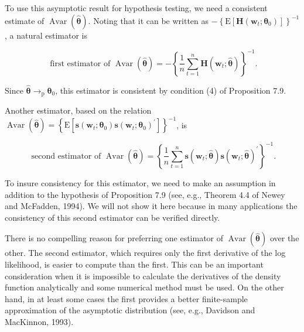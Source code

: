 \documentclass[10pt]{article}
\begin{document}
To use this asymptotic result for hypothesis testing, we need a consistent estimate of $\operatorname{Avar}(\hat{\boldsymbol{\theta}})$. Noting that it can be written as $-\left\{\mathrm{E}\left[\mathbf{H}\left(\mathbf{w}_{t} ; \boldsymbol{\theta}_{0}\right)\right]\right\}^{-1}$, a natural estimator is


\begin{equation*}
\text { first estimator of } \operatorname{Avar}(\hat{\boldsymbol{\theta}})=-\left\{\frac{1}{n} \sum_{t=1}^{n} \mathbf{H}\left(\mathbf{w}_{t} ; \hat{\boldsymbol{\theta}}\right)\right\}^{-1} . \tag{7.3.14}
\end{equation*}


Since $\hat{\boldsymbol{\theta}} \rightarrow_{\mathrm{p}} \boldsymbol{\theta}_{0}$, this estimator is consistent by condition (4) of Proposition 7.9.

Another estimator, based on the relation $\operatorname{Avar}(\hat{\boldsymbol{\theta}})=\left\{\mathrm{E}\left[\mathbf{s}\left(\mathbf{w}_{t} ; \boldsymbol{\theta}_{0}\right) \mathbf{s}\left(\mathbf{w}_{t} ; \boldsymbol{\theta}_{0}\right)^{\prime}\right]\right\}^{-1}$, is


\begin{equation*}
\text { second estimator of } \operatorname{Avar}(\hat{\boldsymbol{\theta}})=\left\{\frac{1}{n} \sum_{t=1}^{n} \mathbf{s}\left(\mathbf{w}_{t} ; \hat{\boldsymbol{\theta}}\right) \mathbf{s}\left(\mathbf{w}_{t} ; \hat{\boldsymbol{\theta}}\right)^{\prime}\right\}^{-1} . \tag{7.3.15}
\end{equation*}


To insure consistency for this estimator, we need to make an assumption in addition to the hypothesis of Proposition 7.9 (see, e.g., Theorem 4.4 of Newey and McFadden, 1994). We will not show it here because in many applications the consistency of this second estimator can be verified directly.

There is no compelling reason for preferring one estimator of $\operatorname{Avar}(\hat{\boldsymbol{\theta}})$ over the other. The second estimator, which requires only the first derivative of the log likelihood, is easier to compute than the first. This can be an important consideration when it is impossible to calculate the derivatives of the density function analytically and some numerical method must be used. On the other hand, in at least some cases the first provides a better finite-sample approximation of the asymptotic distribution (see, e.g., Davidson and MacKinnon, 1993).
\end{document}
